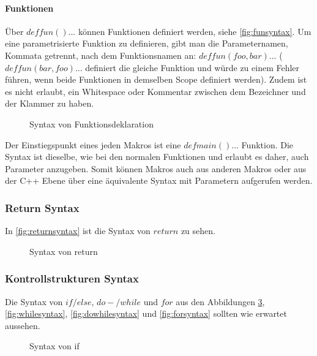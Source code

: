       \paragraph{Funktionen}
        Über \myMIn$def fun(){...}$ können Funktionen definiert werden, siehe \autoref{fig:funsyntax}. Um eine parametrisierte Funktion zu definieren, gibt man die Parameternamen, Kommata getrennt, nach dem Funktionsnamen an: \myMIn$def fun(foo, bar){...}$ (\myMIn$def fun(bar, foo){...}$ definiert die gleiche Funktion und würde zu einem Fehler führen, wenn beide Funktionen in demselben Scope definiert werden). Zudem ist es nicht erlaubt, ein Whitespace oder Kommentar zwischen dem Bezeichner und der Klammer zu haben.
        \begin{figure}[H]
          \centering
          \caption{Syntax von Funktionsdeklaration}
          \label{fig:funsyntax}
        \end{figure}
        Der Einstiegspunkt eines jeden Makros ist eine \myMIn$def main(){...}$ Funktion. Die Syntax ist dieselbe, wie bei den normalen Funktionen und erlaubt es daher, auch Parameter anzugeben. Somit können Makros auch aus anderen Makros oder aus der C++ Ebene über eine äquivalente Syntax mit Parametern aufgerufen werden.

    \subsubsection{Return Syntax}
    \label{sssec:Return Syntax}
      In \autoref{fig:returnsyntax} ist die Syntax von \myMIn$return$ zu sehen.
      \begin{figure}[H]
        \centering
        \caption{Syntax von return}
        \label{fig:returnsyntax}
      \end{figure}

    \subsubsection{Kontrollstrukturen Syntax}
    \label{sssec:Kontrollstrukturen Syntax}
      Die Syntax von \myMIn$if/else$, \myMIn$do-/while$ und \myMIn$for$ aus den Abbildungen \ref{fig:ifsyntax}, \ref{fig:whilesyntax}, \ref{fig:dowhilesyntax} und \ref{fig:forsyntax} sollten wie erwartet aussehen.
      \begin{figure}[H]
        \centering
        \caption{Syntax von if}
        \label{fig:ifsyntax}
      \end{figure}


